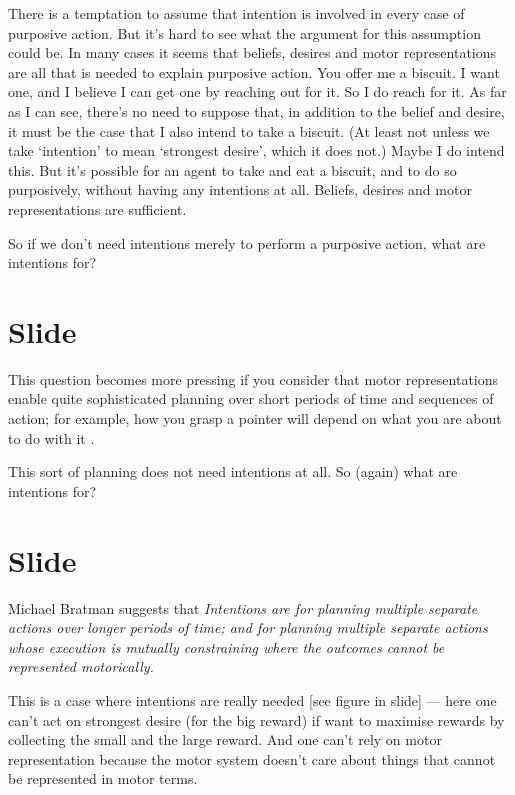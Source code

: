 \documentclass[12pt,\papersize]{extarticle}
\begin{document}
There is a temptation to assume that intention is involved in every case of purposive action.
But it’s hard to see what the argument for this assumption could be.
In many cases it seems that beliefs, desires and motor representations are all that is needed to explain purposive action. 
You offer me a biscuit.  I want one, and I believe I can get one by reaching out for it.  So I do reach for it.  As far as I can see, there’s no need to suppose that, in addition to the belief and desire, it must be the case that I also intend to take a biscuit.  
(At least not unless we take ‘intention’ to mean ‘strongest desire’, which it does not.)  
Maybe I do intend this.  
But it’s possible for an agent to take and eat a biscuit, and to do so purposively, without having any intentions at all.  
Beliefs, desires and motor representations are sufficient.

So if we don't need intentions merely to perform a purposive action, what are intentions for?



\section{Slide}
This question becomes more pressing if you consider that motor representations enable quite sophisticated planning over short periods of time and sequences of action; for example, how you grasp a pointer will depend on what you are about to do with it \citep{zhang:2007_planning}.

This sort of planning does not need intentions at all.  So (again) what are intentions for?



\section{Slide}
Michael Bratman suggests that 
\emph{Intentions are for planning multiple separate actions over longer periods of time; and for planning multiple separate actions whose execution is mutually constraining where the outcomes cannot be represented motorically.}

This is a case where intentions are really needed [see figure in slide] --- here one can’t act on strongest desire (for the big reward) if want to maximise rewards by collecting the small and the large reward.
And one can’t rely on motor representation because the motor system doesn’t care about things that cannot be represented in motor terms.
\end{document}
